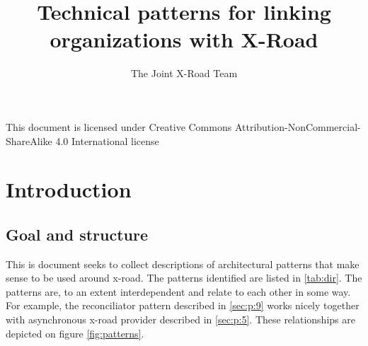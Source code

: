 \documentclass[10pt,a4paper]{article}
\title{Technical patterns for linking organizations with X-Road}
\author{The Joint X-Road Team}
\begin{document}
\maketitle
\clearpage
\setcounter{tocdepth}{2}
\tableofcontents
\clearpage
\thispagestyle{empty}
\null
\vfill

\begin{center}
This document is licensed under Creative Commons Attribution-NonCommercial-ShareAlike 4.0 International license\\[5mm]

\ccbyncsa\end{center}
\clearpage

\setcounter{section}{0}
\section{Introduction}
\subsection{Goal and structure}
This is document seeks to collect descriptions of architectural patterns that make sense to be used around x-road. The patterns identified are listed in \ref{tab:dir}. The patterns are, to an extent interdependent and relate to each other in some way. For example, the reconciliator pattern described in \ref{sec:p:9}  works nicely together with asynchronous x-road provider described in \ref{sec:p:5}. These relationships are depicted on figure \ref{fig:patterns}.
\end{document}
